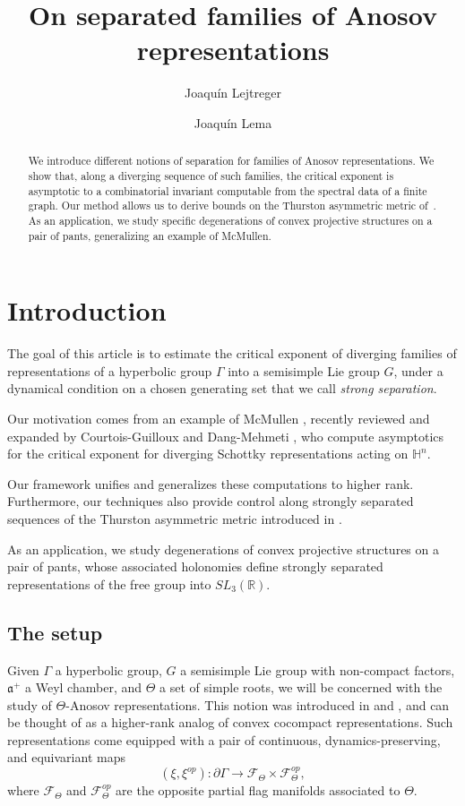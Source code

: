 \documentclass{amsart}
\title{On separated families of Anosov representations}
\author{Joaqu\'in Lejtreger}
\date{}
\author{Joaqu\'in Lema}
\date{}
\newcommand{\RR}{\mathbb{R}}
\newcommand{\HH}{\mathbb{H}}
\theoremstyle{remark}
\theoremstyle{definition}
\begin{document}
\begin{abstract}
We introduce different notions of separation for families of Anosov representations. We show that, along a diverging sequence of such families, the critical exponent is asymptotic to a combinatorial invariant computable from the spectral data of a finite graph. Our method allows us to derive bounds on the Thurston asymmetric metric of~\cite{carvajales2024thurston}. As an application, we study specific degenerations of convex projective structures on a pair of pants, generalizing an example of McMullen.
\end{abstract}

\maketitle

\section{Introduction}
The goal of this article is to estimate the critical exponent of diverging families of representations of a hyperbolic group $\Gamma$ into a semisimple Lie group $G$, under a dynamical condition on a chosen generating set that we call \emph{strong separation}.

Our motivation comes from an example of McMullen \cite{mcmullen1998hausdorff}, recently reviewed and expanded by Courtois-Guilloux \cite{guilloux2024hausdorff} and Dang-Mehmeti \cite{nguyen-bac2024variation}, who compute asymptotics for the critical exponent for diverging Schottky representations acting on $\HH^n$.

Our framework unifies and generalizes these computations to higher rank.
Furthermore, our techniques also provide control along strongly separated sequences of the Thurston asymmetric metric introduced in \cite{carvajales2024thurston}.

As an application, we study degenerations of convex projective structures on a pair of pants, whose associated holonomies define strongly separated representations of the free group into $SL_3(\RR)$.

\subsection{The setup}

Given $\Gamma$ a hyperbolic group, $G$ a semisimple Lie group with non-compact factors, $\mathfrak{a}^+$ a Weyl chamber, and $\Theta$ a set of simple roots, we will be concerned with the study of $\Theta$-Anosov representations. This notion was introduced in \cite{labourie2004anosov} and \cite{guichard2012anosov}, and can be thought of as a higher-rank analog of convex cocompact representations.
Such representations come equipped with a pair of continuous, dynamics-preserving, and equivariant maps 
$$(\xi, \xi^{op}): \partial \Gamma \to \mathcal{F}_\Theta \times \mathcal{F}^{op}_\Theta,$$
where $\mathcal{F}_\Theta$ and $\mathcal{F}^{op}_\Theta$ are the opposite partial flag manifolds associated to $\Theta$. 
\end{document}
